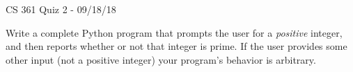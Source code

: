 \documentclass{exam}
\begin{document}
\begin{center}
	CS 361 Quiz 2 - 09/18/18
\end{center}

\vspace{1em}

\begin{center}
\end{center}

\begin{questions}
	
\question[10] Write a complete Python program that prompts the user for a \emph{positive} integer, and then reports whether or not that integer is prime. If the user provides some other input (not a positive integer) your program's behavior is arbitrary.

\end{questions}
\end{document}
